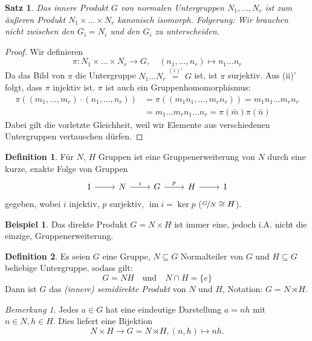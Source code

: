 \documentclass[12pt]{scrartcl} %
\DeclareMathOperator{\im}{im}
\newtheorem{thm}{Satz}[section]
\theoremstyle{definition}
\newtheorem*{defn}{Definition}
\newtheorem{ex}{Beispiel}
\theoremstyle{remark}
\newtheorem*{nb}{Bemerkung}
\begin{document}
\begin{thm}
	Das innere Produkt $G$ von normalen Untergruppen $N_1,\dots,N_r$ ist zum äußeren Produkt $N_1\times\dots \times N_r$ kanonisch isomorph.
	Folgerung: Wir brauchen nicht zwischen den $\overline{G_i}=N_i$ und den $G_i$ zu unterscheiden.
\end{thm}

\begin{proof}
	Wir definieren $$\pi: N_1\times\dots\times N_r \longrightarrow G,\quad (n_1,\dots,n_r)\mapsto n_1\dots n_r$$
	Da das Bild von $\pi$ die Untergruppe $N_1\dots N_r \overset{(i)'}{=} G$ ist, ist $\pi$ surjektiv.
	Aus (ii)' folgt, dass $\pi$ injektiv ist.
	$\pi$ ist auch ein Gruppenhomomorphismus:
	\begin{align*}
		\pi((m_1,\dots,m_r)\cdot (n_1,\dots,n_r)) &= \pi((m_1n_1,\dots,m_rn_r)) = m_1n_1\dots m_rn_r\\
		&= m_1\dots m_rn_1\dots n_r = \pi(\bar m)\pi(\bar n)
	\end{align*}
	Dabei gilt die vorletzte Gleichheit, weil wir Elemente aus verschiedenen Untergruppen vertauschen dürfen.
\end{proof}

\begin{defn}
	Für \(N\), \(H\) Gruppen ist eine Gruppenerweiterung von $N$ durch eine kurze, exakte Folge von Gruppen
	\[ \begin{tikzcd}
		1 \arrow[r] & N \arrow[r, "i"] & G \arrow[r, "p"] & H \arrow[r] & 1
	\end{tikzcd} \]
	gegeben, wobei $i$ injektiv, $p$ surjektiv, $\im i = \ker p$ ($\nicefrac{G}{N} \cong H$). %
\end{defn}

\begin{ex}
	Das direkte Produkt $G=N\times H$ ist immer eine, jedoch i.A. nicht die einzige, Gruppenerweiterung.
\end{ex}

\begin{defn}
	Es seien $G$ eine Gruppe, $N\subseteq G$ Normalteiler von $G$ und $H\subseteq G$ beliebige Untergruppe, sodass gilt:
	$$G=NH \quad \text{und} \quad N\cap H = \{e\}$$
	Dann ist $G$ das \emph{(innere) semidirekte Produkt} von $N$ und $H$, Notation: $G=N\rtimes H$.
\end{defn}

\begin{nb}
	Jedes $a\in G$ hat eine eindeutige Darstellung $a=nh$ mit $n\in N, h\in H$.
	Dies liefert eine Bijektion $$N\times H \to G=N\rtimes H, (n,h)\mapsto nh.$$
\end{nb}
\end{document}
